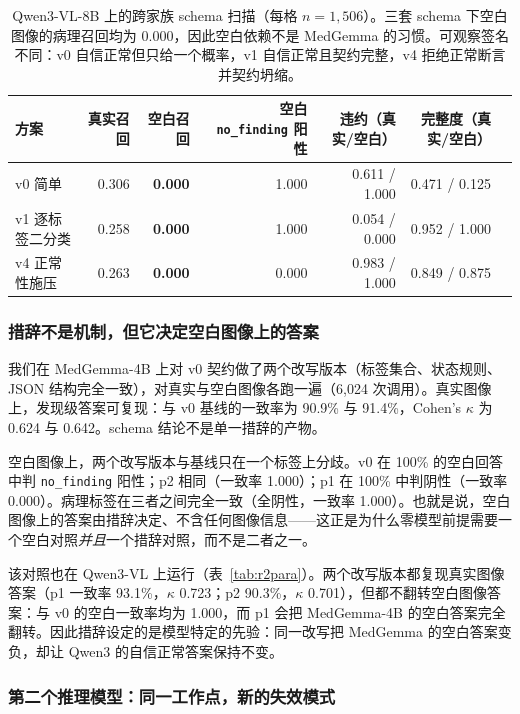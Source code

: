 \begin{table}[t]
\centering
\footnotesize
\setlength{\tabcolsep}{3.5pt}
\caption{Qwen3-VL-8B 上的跨家族 schema 扫描（每格 $n=1{,}506$）。三套 schema 下空白图像的病理召回均为 0.000，因此空白依赖不是 MedGemma 的习惯。可观察签名不同：v0 自信正常但只给一个概率，v1 自信正常且契约完整，v4 拒绝正常断言并契约坍缩。}
\label{tab:r2xfamily}
\begin{tabular}{lrrrrrr}
\toprule
方案 & 真实召回 & 空白召回 & 空白 \texttt{no\_finding} 阳性 & 违约（真实/空白） & 完整度（真实/空白） \\
\midrule
v0 简单 & 0.306 & \textbf{0.000} & 1.000 & 0.611 / 1.000 & 0.471 / 0.125 \\
v1 逐标签二分类 & 0.258 & \textbf{0.000} & 1.000 & 0.054 / 0.000 & 0.952 / 1.000 \\
v4 正常性施压 & 0.263 & \textbf{0.000} & 0.000 & 0.983 / 1.000 & 0.849 / 0.875 \\
\bottomrule
\end{tabular}
\end{table}

\subsubsection{措辞不是机制，但它决定空白图像上的答案}
\label{sec:results-paraphrase}

我们在 MedGemma-4B 上对 v0 契约做了两个改写版本（标签集合、状态规则、JSON 结构完全一致），对真实与空白图像各跑一遍（6,024 次调用）。真实图像上，发现级答案可复现：与 v0 基线的一致率为 90.9\% 与 91.4\%，Cohen's $\kappa$ 为 0.624 与 0.642。schema 结论不是单一措辞的产物。

空白图像上，两个改写版本与基线只在一个标签上分歧。v0 在 100\% 的空白回答中判 \texttt{no\_finding} 阳性；p2 相同（一致率 1.000）；p1 在 100\% 中判阴性（一致率 0.000）。病理标签在三者之间完全一致（全阴性，一致率 1.000）。也就是说，空白图像上的答案由措辞决定、不含任何图像信息——这正是为什么零模型前提需要一个空白对照\emph{并且}一个措辞对照，而不是二者之一。

该对照也在 Qwen3-VL 上运行（表~\ref{tab:r2para}）。两个改写版本都复现真实图像答案（p1 一致率 93.1\%，$\kappa$ 0.723；p2 90.3\%，$\kappa$ 0.701），但都不翻转空白图像答案：与 v0 的空白一致率均为 1.000，而 p1 会把 MedGemma-4B 的空白答案完全翻转。因此措辞设定的是模型特定的先验：同一改写把 MedGemma 的空白答案变负，却让 Qwen3 的自信正常答案保持不变。

\subsubsection{第二个推理模型：同一工作点，新的失效模式}
\label{sec:results-second}

